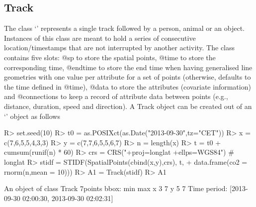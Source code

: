 \documentclass[article]{jss}
\newcommand{\class}[1]{`\code{#1}'}
\begin{document}
\subsection{Track}
The class \class{Track} represents a single track followed by a person, animal or an object. Instances of this class are meant to hold a series of consecutive location/timestamps that are not interrupted by another activity. The class contains five slots: @sp to store the spatial points, @time to store the corresponding time, @endtime to store the end time when having generalised line geometries with one value per attribute for a set of points (otherwise, defaults to the time defined in @time), @data to store the attributes (covariate information) and @connections to keep a record of attribute data between points (e.g., distance, duration, speed and direction). A Track object can be created out of an \class{STIDF} object as follows
\begin{Schunk}
\begin{Sinput}
R> set.seed(10)
R> t0 = as.POSIXct(as.Date("2013-09-30",tz="CET"))
R> x = c(7,6,5,5,4,3,3)
R> y = c(7,7,6,5,5,6,7)
R> n = length(x)
R> t = t0 + cumsum(runif(n) * 60)
R> crs = CRS("+proj=longlat +ellps=WGS84") # longlat
R> stidf = STIDF(SpatialPoints(cbind(x,y),crs), t, 
+                  data.frame(co2 = rnorm(n,mean = 10)))
R> A1 = Track(stidf)
R> A1
\end{Sinput}
\begin{Soutput}
An object of class Track 
7points 
bbox: 
  min max
x   3   7
y   5   7
Time period: [2013-09-30 02:00:30, 2013-09-30 02:02:31]
\end{Soutput}
\end{Schunk}
\end{document}
